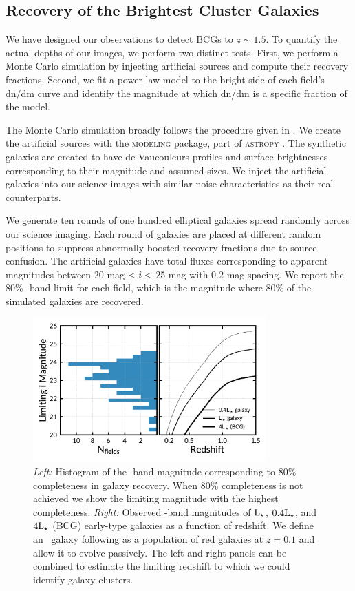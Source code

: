 \documentclass[apj, revtex4-1]{emulateapj}
\begin{document}
\subsection{Recovery of the Brightest Cluster Galaxies}\label{sec:cluster finding}
We have designed our observations to detect BCGs to $z\sim1.5$. To quantify the actual depths of our images, we perform two distinct tests. First, we perform a Monte Carlo simulation by injecting artificial sources and compute their recovery fractions. Second, we fit a power-law model to the bright side of each field's dn/dm curve and identify the magnitude at which dn/dm is a specific fraction of the model.

The Monte Carlo simulation broadly follows the procedure given in \cite{Menanteau2010a}. We create the artificial sources with the \textsc{modeling} package, part of \textsc{astropy} \citep{TheAstropyCollaboration2013}. The synthetic galaxies are created to have de Vaucouleurs \citep{DeVaucouleurs1948} profiles and surface brightnesses corresponding to their magnitude and assumed sizes. We inject the artificial galaxies into our science images with similar noise characteristics as their real counterparts.

We generate ten rounds of one hundred elliptical galaxies spread randomly across our science imaging. Each round of galaxies are placed at different random positions to suppress abnormally boosted recovery fractions due to source confusion. The artificial galaxies have total fluxes corresponding to apparent magnitudes between 20 mag $< \hbox{$i$} <$ 25 mag with $0.2$ mag spacing. We report the 80\% \sdssi-band limit for each field, which is the magnitude where 80\% of the simulated galaxies are recovered.

\begin{figure}
	\centering
	\includegraphics[width=0.8\textwidth]{figures/recovery_redshift.pdf}
	\caption{\textit{Left:} Histogram of the \sdssi-band magnitude corresponding to 80\% completeness in galaxy recovery. When 80\% completeness is not achieved we show the limiting magnitude with the highest completeness. \textit{Right:} Observed \sdssi-band magnitudes of $\hbox{L$_{\star}$}$, $0.4\hbox{L$_{\star}$}$, and $4\hbox{L$_{\star}$}$ (BCG) early-type galaxies as a function of redshift. We define an \lstar\ galaxy following \cite{Blanton2003} as a population of red galaxies at $z = 0.1$ and allow it to evolve passively. The left and right panels can be combined to estimate the limiting redshift to which we could identify galaxy clusters.}
	\label{fig:recovery_redshift}
\end{figure}
\end{document}
